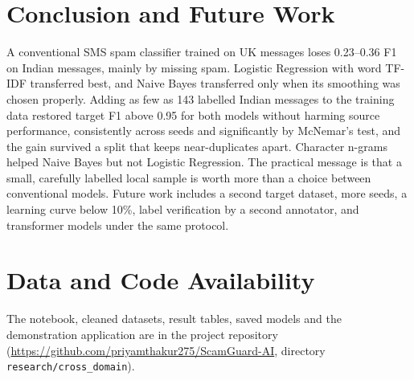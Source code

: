 \documentclass[conference]{IEEEtran}
\begin{document}
\section{Conclusion and Future Work}
A conventional SMS spam classifier trained on UK messages loses 0.23--0.36 F1 on Indian messages, mainly by missing spam. Logistic Regression with word TF-IDF transferred best, and Naive Bayes transferred only when its smoothing was chosen properly. Adding as few as 143 labelled Indian messages to the training data restored target F1 above 0.95 for both models without harming source performance, consistently across seeds and significantly by McNemar's test, and the gain survived a split that keeps near-duplicates apart. Character n-grams helped Naive Bayes but not Logistic Regression. The practical message is that a small, carefully labelled local sample is worth more than a choice between conventional models. Future work includes a second target dataset, more seeds, a learning curve below 10\%, label verification by a second annotator, and transformer models under the same protocol.

\section*{Data and Code Availability}
The notebook, cleaned datasets, result tables, saved models and the demonstration application are in the project repository (\url{https://github.com/priyamthakur275/ScamGuard-AI}, directory \texttt{research/cross\_domain}).
\end{document}
